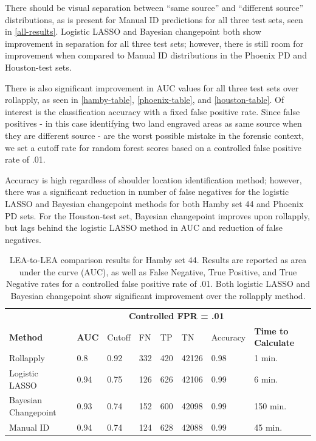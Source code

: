 \documentclass[12pt]{article}
\begin{document}
There should be visual separation between ``same source'' and
``different source'' distributions, as is present for Manual ID
predictions for all three test sets, seen in \autoref{all-results}.
Logistic LASSO and Bayesian changepoint both show improvement in
separation for all three test sets; however, there is still room for
improvement when compared to Manual ID distributions in the Phoenix PD
and Houston-test sets.

There is also significant improvement in AUC values for all three test
sets over rollapply, as seen in \autoref{hamby-table},
\autoref{phoenix-table}, and \autoref{houston-table}. Of interest is the
classification accuracy with a fixed false positive rate. Since false
positives - in this case identifying two land engraved areas as same
source when they are different source - are the worst possible mistake
in the forensic context, we set a cutoff rate for random forest scores
based on a controlled false positive rate of .01.

Accuracy is high regardless of shoulder location identification method;
however, there was a significant reduction in number of false negatives
for the logistic LASSO and Bayesian changepoint methods for both Hamby
set 44 and Phoenix PD sets. For the Houston-test set, Bayesian
changepoint improves upon rollapply, but lags behind the logistic LASSO
method in AUC and reduction of false negatives.

\begin{table}[]
\centering
\begin{tabular}{llllllll}
& & \multicolumn{5}{c}{\textbf{Controlled FPR = .01}} & \\
\textbf{Method} & \textbf{AUC} & Cutoff & FN &TP & TN & Accuracy & \textbf{Time to Calculate} \\ \hline
Rollapply & 0.8 &  0.92 & 332 & 420&42126 & 0.98 & 1 min.\\ \hline
Logistic LASSO & 0.94 &  0.75 &126 &626 &42106 & 0.99 & 6 min. \\ \hline
Bayesian Changepoint & 0.93 &  0.74 &152 & 600&42098 & 0.99 & 150 min. \\ \hline
Manual ID & 0.94 & 0.74 & 124& 628&42088 & 0.99 & 45 min. \\ \hline 
\end{tabular}
\caption{LEA-to-LEA comparison results for Hamby set 44. Results are reported as area under the curve (AUC), as well as False Negative, True Positive, and True Negative rates for a controlled false positive rate of .01. Both logistic LASSO and Bayesian changepoint show significant improvement over the rollapply method.}
\label{hamby-table}
\end{table}
\end{document}
